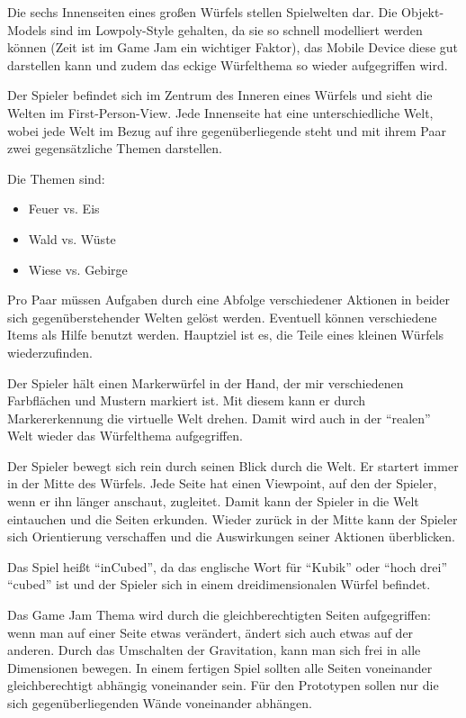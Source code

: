 
Die sechs Innenseiten eines großen Würfels stellen Spielwelten dar. Die Objekt-Models sind im Lowpoly-Style gehalten, da sie so schnell modelliert werden können (Zeit ist im Game Jam ein wichtiger Faktor), das Mobile Device diese gut darstellen kann und zudem das eckige Würfelthema so wieder aufgegriffen wird.

Der Spieler befindet sich im Zentrum des Inneren eines Würfels und sieht die Welten im First-Person-View. Jede Innenseite hat eine unterschiedliche Welt, wobei jede Welt im Bezug auf ihre gegenüberliegende steht und mit ihrem Paar zwei gegensätzliche Themen darstellen.    

Die Themen sind:
\begin{itemize}
\item Feuer vs. Eis
\item Wald vs. Wüste
\item Wiese vs. Gebirge
\end{itemize}

Pro Paar müssen Aufgaben durch eine Abfolge verschiedener Aktionen in beider sich gegenüberstehender Welten gelöst werden. Eventuell können verschiedene Items als Hilfe benutzt werden. Hauptziel ist es, die Teile eines kleinen Würfels wiederzufinden.

Der Spieler hält einen Markerwürfel in der Hand, der mir verschiedenen Farbflächen und Mustern markiert ist. Mit diesem kann er durch Markererkennung die virtuelle Welt drehen. Damit wird auch in der \enquote{realen} Welt wieder das Würfelthema aufgegriffen.

Der Spieler bewegt sich rein durch seinen Blick durch die Welt. Er startert immer in der Mitte des Würfels. Jede Seite hat einen Viewpoint, auf den der Spieler, wenn er ihn länger anschaut, zugleitet. Damit kann der Spieler in die Welt eintauchen und die Seiten erkunden. Wieder zurück in der Mitte kann der Spieler sich Orientierung verschaffen und die Auswirkungen seiner Aktionen überblicken.

Das Spiel heißt \enquote{inCubed}, da das englische Wort für \enquote{Kubik} oder \enquote{hoch drei} \enquote{cubed} ist und der Spieler sich in einem dreidimensionalen Würfel befindet.

Das Game Jam Thema wird durch die gleichberechtigten Seiten aufgegriffen: wenn man auf einer Seite etwas verändert, ändert sich auch etwas auf der anderen. Durch das Umschalten der Gravitation, kann man sich frei in alle Dimensionen bewegen. In einem fertigen Spiel sollten alle Seiten voneinander gleichberechtigt abhängig voneinander sein. Für den Prototypen sollen nur die sich gegenüberliegenden Wände voneinander abhängen.    